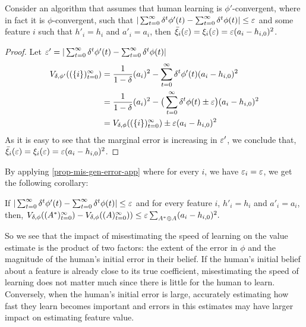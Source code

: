 \begin{observation}
Consider an algorithm that assumes that human learning is $\phi'$-convergent, where in fact it is $\phi$-convergent, such that $|\sum_{t=0}^\infty \delta^t \phi'(t) - \sum_{t=0}^\infty \delta^t \phi(t)| \leq \varepsilon$ and some feature $i$ such that $h'_i=h_i$ and $a'_i= a_i$, then 
{$\bar \xi_i(\varepsilon) = \xi_i(\varepsilon) = \varepsilon (a_i-h_{i,0})^2$}.
\end{observation}
\begin{proof}
Let $\varepsilon' = |\sum_{t=0}^\infty \delta^t \phi'(t) - \sum_{t=0}^\infty \delta^t \phi(t)|$
\begin{align*}
   V_{\delta,\phi'}((\{i\})_{t=0}^\infty) &=   \frac{1}{1-\delta}(a_i)^2 - \sum_{t=0}^\infty \delta^t \phi'(t)(a_i-h_{i,0})^2 \\
   &= \frac{1}{1-\delta}(a_i)^2 - \big(\sum_{t=0}^\infty \delta^t \phi(t) \pm\varepsilon \big)(a_i-h_{i,0})^2 \\ 
   &=   V_{\delta,\phi}((\{i\})_{t=0}^\infty) \pm \varepsilon (a_i-h_{i,0})^2
\end{align*}
 As it is easy to see that the marginal error is increasing in $\varepsilon'$, we conclude that, $\bar \xi_i(\varepsilon) = \xi_i(\varepsilon) = \varepsilon (a_i-h_{i,0})^2$.   
\end{proof}
By applying \cref{prop-mis-gen-error-app} where for every $i$, we have $\varepsilon_i=\varepsilon$, we get the following corollary: 
 \begin{corollary}
  If  $|\sum_{t=0}^\infty \delta^t \phi'(t) - \sum_{t=0}^\infty \delta^t \phi(t)| \leq \varepsilon$ and for every feature $i$, $h'_i=h_i$ and $a'_i= a_i$, then, 
$V_{\delta,\phi}((A^*)_{t=0}^\infty)-V_{\delta,\phi}((A)_{t=0}^\infty)) \leq  \varepsilon \sum_{A^* \oplus A } (a_i-h_{i,0})^2.$

 \end{corollary}
 
So we see that the impact of misestimating the speed of learning on the value estimate is the product of two factors: %
the extent of the error in $\phi$ and the magnitude of the human's initial error in their belief.
 If the human's initial belief about a feature is already close to its true coefficient, misestimating the speed of learning does not matter much since there is little for the human to learn. Conversely, when the human's initial error is large, accurately estimating how fast they learn becomes important and errors in this estimates may have larger impact on estimating feature value.

